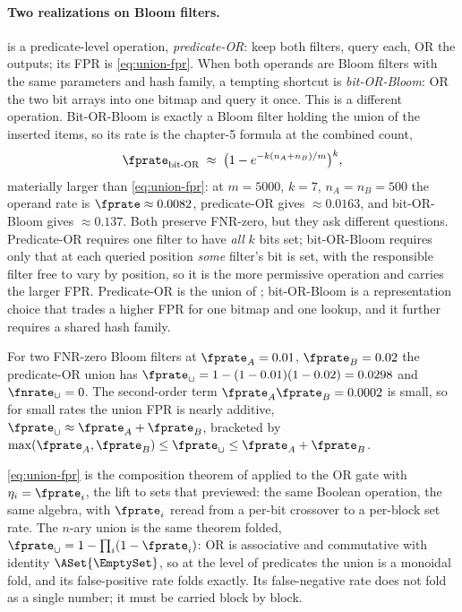 \paragraph{Two realizations on Bloom filters.}
 is a predicate-level operation, \emph{predicate-OR}:
keep both filters, query each, OR the outputs; its FPR is
\eqref{eq:union-fpr}. When both operands are Bloom filters with the same
parameters and hash family, a tempting shortcut is \emph{bit-OR-Bloom}: OR
the two bit arrays into one bitmap and query it once. This is a different
operation. Bit-OR-Bloom is exactly a Bloom filter holding the union of the
inserted items, so its rate is the chapter-5 formula at the combined count,
\begin{equation}
\label{eq:bit-or-bloom-fpr}
  \fprate_{\text{bit-OR}} \;\approx\; \bigl(1 - e^{-k(n_A + n_B)/m}\bigr)^k,
\end{equation}
materially larger than \eqref{eq:union-fpr}: at $m = 5000$, $k = 7$,
$n_A = n_B = 500$ the operand rate is $\fprate \approx 0.0082$, predicate-OR
gives $\approx 0.0163$, and bit-OR-Bloom gives $\approx 0.137$. Both
preserve FNR-zero, but they ask different questions. Predicate-OR requires
one filter to have \emph{all} $k$ bits set; bit-OR-Bloom requires only that
at each queried position \emph{some} filter's bit is set, with the
responsible filter free to vary by position, so it is the more permissive
operation and carries the larger FPR. Predicate-OR is the union of
; bit-OR-Bloom is a representation choice that trades
a higher FPR for one bitmap and one lookup, and it further requires a shared
hash family.

For two FNR-zero Bloom filters at $\fprate_A = 0.01$, $\fprate_B = 0.02$ the
predicate-OR union has $\fprate_\cup = 1 - (1 - 0.01)(1 - 0.02) = 0.0298$ and
$\fnrate_\cup = 0$. The second-order term $\fprate_A \fprate_B = 0.0002$ is
small, so for small rates the union FPR is nearly additive,
$\fprate_\cup \approx \fprate_A + \fprate_B$, bracketed by
$\max(\fprate_A, \fprate_B) \le \fprate_\cup \le \fprate_A + \fprate_B$.

\eqref{eq:union-fpr} is the composition theorem of 
applied to the OR gate with $\eta_i = \fprate_i$, the lift to sets that
 previewed: the same Boolean operation, the same
algebra, with $\fprate_i$ reread from a per-bit crossover to a per-block set
rate. The $n$-ary union is the same theorem folded, $\fprate_\cup = 1 -
\prod_i (1 - \fprate_i)$: OR is associative and commutative with identity
$\ASet{\EmptySet}$, so at the level of predicates the union is a monoidal
fold, and its false-positive rate folds exactly. Its false-negative rate does
not fold as a single number; it must be carried block by block.

